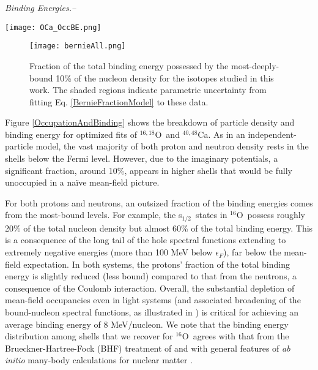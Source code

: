 \documentclass[twocolumn,secnumarabic,amssymb, nobibnotes, aps, prl, superscriptaddress, nobalancelastpage]{revtex4-1}
\newcommand{\oSix}{\ensuremath{^{16}}O}
\newcommand{\oSixEight}{\ensuremath{^{16,18}}O}
\newcommand{\caAughtEight}{\ensuremath{^{40,48}}C\lowercase{a}}
\newcommand{\sOne}{s\ensuremath{_{1/2}}}
\begin{document}
\textit{Binding Energies.--}
\begin{figure*}[!htb]
    \texttt{[image: OCa\_OccBE.png]}
    \caption{\label{OccupationAndBinding}DOM calculations of nucleon occupation
        and binding energy contributions as a function of angular
        momenta $\ell j$ in \oSixEight\ and \caAughtEight. The results shown are
        using the median posterior parameter values from MCMC sampling.}
\end{figure*}
\begin{figure}[!htb]
    \texttt{[image: bernieAll.png]}
    \caption{\label{BerniePlot} Fraction of the total binding energy possessed by the
        most-deeply-bound 10\% of the nucleon density for the isotopes
        studied in this work. The shaded regions indicate parametric uncertainty
        from fitting Eq. \ref{BernieFractionModel} to these data.}
\end{figure}
Figure \ref{OccupationAndBinding} shows the breakdown of particle density and binding
energy for optimized fits of \oSixEight\ and \caAughtEight. As in an independent-particle model, the vast majority of
both proton and neutron density rests in the shells below the Fermi level. However, due to the
imaginary potentials, a significant fraction, around 10\%, appears in higher shells
that would be fully unoccupied in a na\"ive mean-field picture.

For both protons and neutrons, an outsized fraction
of the binding energies comes from the most-bound levels. For example, the \sOne\ states in
\oSix\ possess roughly 20\% of the total nucleon density but almost 60\% of the total binding energy.
This is a consequence of the long tail of the hole spectral functions extending to extremely negative energies
(more than 100 MeV below $\epsilon_{F}$), far below the mean-field expectation.
In both systems, the protons' fraction of the total binding energy is
slightly reduced (less bound) compared to that from the neutrons, a consequence of the Coulomb interaction.
Overall, the substantial depletion of
mean-field occupancies even in light systems (and associated broadening of the bound-nucleon spectral
functions, as illustrated in \cite{Atkinson2020}) is critical for achieving an average
binding energy of 8 MeV/nucleon. We note that the binding energy distribution among
shells that we recover for \oSix\ agrees with that from the Brueckner-Hartree-Fock (BHF) treatment of \cite{Muther1995}
and with general features of \textit{ab initio} many-body calculations for nuclear matter \cite{Vonderfecht1993}.
\end{document}
